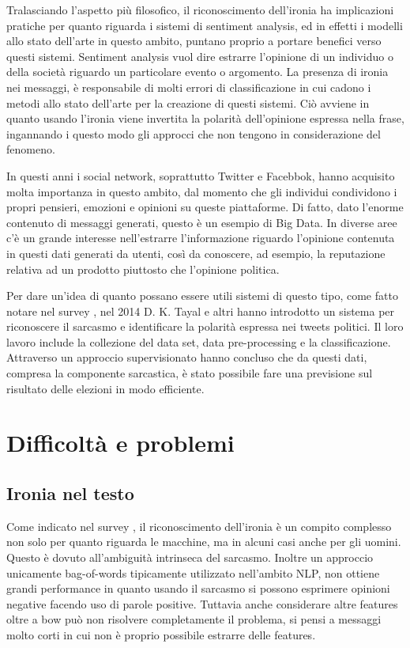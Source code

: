 \documentclass[oneside]{book}
\begin{document}
Tralasciando l'aspetto più filosofico, il riconoscimento dell'ironia ha implicazioni pratiche per quanto riguarda i sistemi di sentiment analysis, ed in effetti i modelli allo stato dell'arte in questo ambito, puntano proprio a portare benefici verso questi sistemi. Sentiment analysis vuol dire estrarre l'opinione di un individuo o della società riguardo un particolare evento o argomento. La presenza di ironia nei messaggi, è responsabile di molti errori di classificazione in cui cadono i metodi allo stato dell'arte per la creazione di questi sistemi. Ciò avviene in quanto usando l'ironia viene invertita la polarità dell'opinione espressa nella frase, ingannando i questo modo gli approcci che non tengono in considerazione del fenomeno.

In questi anni i social network, soprattutto Twitter e Facebbok, hanno acquisito molta importanza in questo ambito, dal momento che gli individui condividono i propri pensieri, emozioni e opinioni su queste piattaforme. Di fatto, dato l'enorme contenuto di messaggi generati, questo è un esempio di Big Data. In diverse aree c'è un grande interesse nell'estrarre l'informazione riguardo l'opinione contenuta in questi dati generati da utenti, così da conoscere, ad esempio, la reputazione relativa ad un prodotto piuttosto che l'opinione politica.

Per dare un'idea di quanto possano essere utili sistemi di questo tipo, come fatto notare nel survey \cite{survey1}, nel 2014 D. K. Tayal e altri \cite{political} hanno introdotto un sistema per riconoscere il sarcasmo e identificare la polarità espressa nei tweets politici. Il loro lavoro include la collezione del data set, data pre-processing e la classificazione. Attraverso un approccio supervisionato hanno concluso che da questi dati, compresa la componente sarcastica, è stato possibile fare una previsione sul risultato delle elezioni in modo efficiente.

\section{Difficoltà e problemi}

\subsection{Ironia nel testo}
Come indicato nel survey \cite{survey3}, il riconoscimento dell'ironia è un compito complesso non solo per quanto riguarda le macchine, ma in alcuni casi anche per gli uomini. Questo è dovuto all'ambiguità intrinseca del sarcasmo. Inoltre un approccio unicamente bag-of-words tipicamente utilizzato nell'ambito NLP, non ottiene grandi performance in quanto usando il sarcasmo si possono esprimere opinioni negative facendo uso di parole positive. Tuttavia anche considerare altre features oltre a bow può non risolvere completamente il problema, si pensi a messaggi molto corti in cui non è proprio possibile estrarre delle features.
\end{document}
